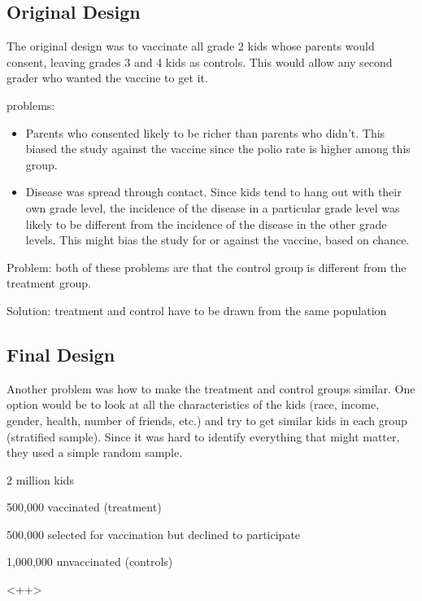 \documentclass[landscape]{exam}
\begin{document}
  \subsection{Original Design}
  The original design was to vaccinate all grade 2 kids whose parents would
  consent, leaving grades 3 and 4 kids as controls.  This would allow any second
  grader who wanted the vaccine to get it.

  problems:
  \begin{itemize}

    \item Parents who consented likely to be richer than parents who didn't.
      This biased the study against the vaccine since the polio rate is higher
      among this group.

    \item Disease was spread through contact.  Since kids tend to hang out with
      their own grade level, the incidence of the disease in a particular grade
      level was likely to be different from the incidence of the disease in the
      other grade levels. This might bias the study for or against the vaccine,
      based on chance.
  \end{itemize}

  Problem: both of these problems are that the control group is different from the
  treatment group.

  Solution: treatment and control have to be drawn from the same population

  \subsection{Final Design}
  Another problem was how to make the treatment and control groups similar.  One
  option would be to look at all the characteristics of the kids (race, income,
  gender, health, number of friends, etc.) and try to get similar kids in each
  group (stratified sample).  Since it was hard to identify everything that
  might matter, they used a simple random sample.

  \begin{itemize*}
    \item 2 million kids
    \item 500,000 vaccinated (treatment)
    \item 500,000 selected for vaccination but declined to participate
    \item 1,000,000 unvaccinated (controls)
  \end{itemize*}<++>
\end{document}
